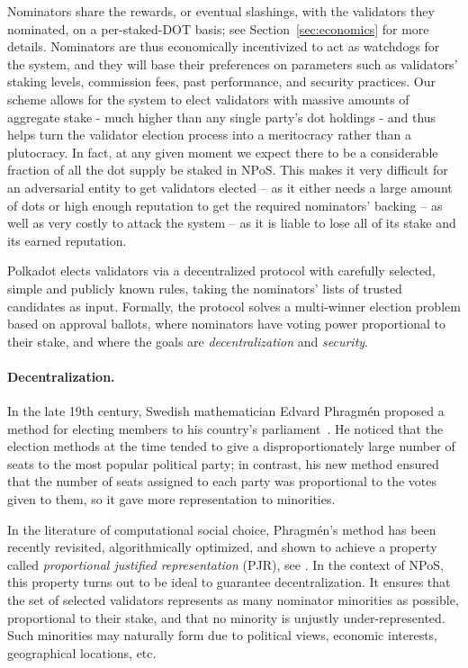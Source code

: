 Nominators share the rewards, or eventual slashings, with the validators they nominated, on a per-staked-DOT basis; 
see Section~\ref{sec:economics} for more details. 
Nominators are thus economically incentivized to act as watchdogs for the system, and they will base their preferences 
on parameters such as validators' staking levels, commission fees, past performance, and security practices.
Our scheme allows for the system to elect validators with massive amounts of aggregate stake
- much higher than any single party's dot holdings -
and thus helps turn the validator election process into a meritocracy rather than a plutocracy.
In fact, at any given moment we expect there to be a considerable fraction of all the dot supply be staked in NPoS.
This makes it very difficult for an adversarial entity to get validators elected 
-- as it either needs a large amount of dots or high enough reputation to get the required nominators' backing -- 
as well as very costly to attack the system -- as it is liable to lose all of its stake and its earned reputation.

Polkadot elects validators via a decentralized protocol with carefully selected, simple and publicly known rules,
taking the nominators' lists of trusted candidates as input. Formally, the protocol solves a multi-winner election
problem based on approval ballots, where nominators have voting power proportional to their stake,
and where the goals are \emph{decentralization} and \emph{security}.

\paragraph{Decentralization.} In the late 19th century, Swedish mathematician Edvard Phragm\'{e}n
proposed a method for electing members to his country’s parliament~\cite{brill2017phragmen}.
He noticed that the election methods at the time tended to give a disproportionately large number of seats 
to the most popular political party; in contrast, his new method ensured that the number of seats
assigned to each party was proportional to the votes given to them, so it gave more representation to minorities.

In the literature of computational social choice, Phragm\'{e}n's method has been recently revisited, 
algorithmically optimized, and shown to achieve a property called \emph{proportional justified representation} (PJR), 
see \cite{sanchez2017proportional, brill2017phragmen}.
In the context of NPoS, this property turns out to be ideal to guarantee decentralization.
It ensures that the set of selected validators represents as many nominator minorities as possible,
proportional to their stake, and that no minority is unjustly under-represented.
Such minorities may naturally form due to political views, economic interests, geographical locations, etc.

